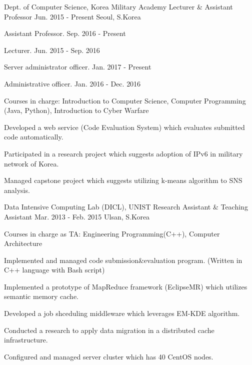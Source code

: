 


\begin{cventries}


\cventry
{Dept. of Computer Science, Korea Military Academy} %
{Lecturer \& Assistant Professor} %
{Jun. 2015 -  Present} %
{Seoul, S.Korea} %
{ %
\begin{cvitems}
\item {Assistant Professor. Sep. 2016 - Present}
\item {Lecturer. Jun. 2015 - Sep. 2016}
\item {Server administrator officer. Jan. 2017 - Present}
\item {Administrative officer. Jan. 2016 - Dec. 2016}
\item {Courses in charge: Introduction to Computer Science, Computer Programming (Java, Python), Introduction to Cyber Warfare}
\item {Developed a web service (Code Evaluation System) which evaluates submitted code automatically.}
\item {Participated in a research project which suggests adoption of IPv6 in military network of Korea.}
\item {Managed capstone project which suggests utilizing k-means algorithm to SNS analysis.}
\end{cvitems}
}


\cventry
{Data Intensive Computing Lab (DICL), UNIST} %
{Research Assistant \& Teaching Assistant} %
{Mar. 2013 - Feb. 2015} %
{Ulsan, S.Korea} %
{ %
\begin{cvitems}
\item {Courses in charge as TA: Engineering Programming(C++), Computer Architecture}
\item {Implemented and managed code submission\&evaluation program. (Written in C++ language with Bash script)}
\item {Implemented a prototype of MapReduce framework (EclipseMR) which utilizes semantic memory cache.}
\item {Developed a job shceduling middleware which leverages EM-KDE algorithm.}
\item {Conducted a research to apply data migration in a distributed cache infrastructure.}
\item {Configured and managed server cluster which has 40 CentOS nodes.}
\end{cvitems}
}


\end{cventries}
